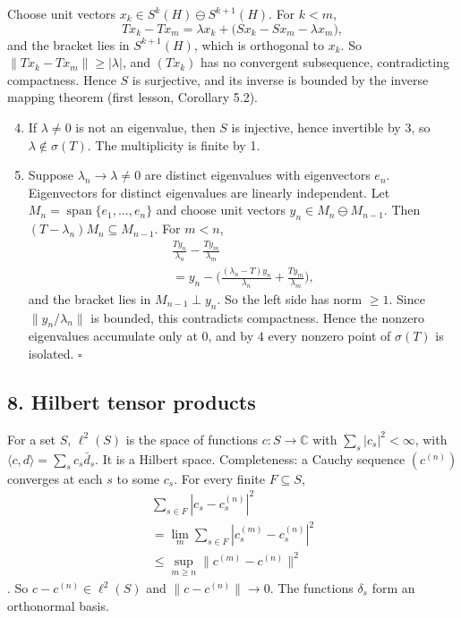 \documentclass[
  english,
  11pt,
  a4paper,
]{article}
\begin{document}
Choose unit vectors \(x_k\in S^k(H)\ominus S^{k+1}(H)\). For \(k<m\),
\[Tx_k-Tx_m=\lambda x_k+\big(Sx_k-Sx_m-\lambda x_m\big),\] and the
bracket lies in \(S^{k+1}(H)\), which is orthogonal to \(x_k\). So
\(\|Tx_k-Tx_m\|\ge|\lambda|\), and \((Tx_k)\) has no convergent
subsequence, contradicting compactness. Hence \(S\) is surjective, and
its inverse is bounded by the inverse mapping theorem (first lesson,
Corollary 5.2).

\begin{enumerate}
\setcounter{enumi}{3}
\item
  If \(\lambda\ne0\) is not an eigenvalue, then \(S\) is injective,
  hence invertible by 3, so \(\lambda\notin\sigma(T)\). The multiplicity
  is finite by 1.
\item
  Suppose \(\lambda_n\to\lambda\ne0\) are distinct eigenvalues with
  eigenvectors \(e_n\). Eigenvectors for distinct eigenvalues are
  linearly independent. Let \(M_n=\operatorname{span}\{e_1,\dots,e_n\}\)
  and choose unit vectors \(y_n\in M_n\ominus M_{n-1}\). Then
  \((T-\lambda_n)M_n\subseteq M_{n-1}\). For \(m<n\), \[\begin{gathered}
  \frac{Ty_n}{\lambda_n}-\frac{Ty_m}{\lambda_m}\\
  =y_n-\Big(\frac{(\lambda_n-T)y_n}{\lambda_n}+\frac{Ty_m}{\lambda_m}\Big),
  \end{gathered}\] and the bracket lies in \(M_{n-1}\perp y_n\). So the
  left side has norm \(\ge1\). Since \(\|y_n/\lambda_n\|\) is bounded,
  this contradicts compactness. Hence the nonzero eigenvalues accumulate
  only at \(0\), and by 4 every nonzero point of \(\sigma(T)\) is
  isolated. \(\square\)
\end{enumerate}

\subsection[8. Hilbert tensor
products]{\texorpdfstring{\protect\hypertarget{hilbert-spaces-and-compact-operators--oa-fnd-hs-08}{}{}8.
Hilbert tensor
products}{8. Hilbert tensor products}}\label{hilbert-spaces-and-compact-operators--OA-FND-HS-08}

For a set \(S\), \(\ell^2(S)\) is the space of functions
\(c:S\to\mathbb C\) with \(\sum_s|c_s|^2<\infty\), with
\(\langle c,d\rangle=\sum_sc_s\bar d_s\). It is a Hilbert space.
Completeness: a Cauchy sequence \((c^{(n)})\) converges at each \(s\) to
some \(c_s\). For every finite \(F\subseteq S\), \[\begin{gathered}
\sum_{s\in F}|c_s-c^{(n)}_s|^2\\
=\lim_m\sum_{s\in F}|c^{(m)}_s-c^{(n)}_s|^2\\
\le\sup_{m\ge n}\|c^{(m)}-c^{(n)}\|^2
\end{gathered}\]. So \(c-c^{(n)}\in\ell^2(S)\) and
\(\|c-c^{(n)}\|\to0\). The functions \(\delta_s\) form an orthonormal
basis.
\end{document}
